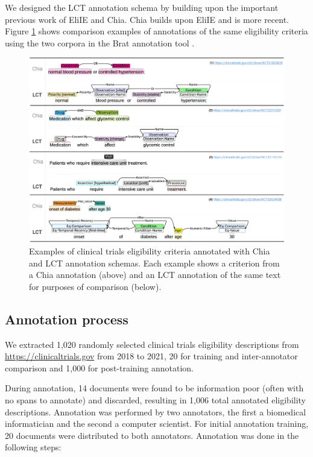\documentclass[../main.tex]{subfiles}
\begin{document}
We designed the LCT annotation schema by building upon the important previous work of EliIE and Chia. Chia builds upon EliIE and is more recent. Figure \ref{aim1_fig_chia_vs_lct} shows comparison examples of annotations of the same eligibility criteria using the two corpora in the Brat annotation tool \cite{stenetorp2012brat}. \\

\begin{figure}[h!]
  \includegraphics[scale=0.56]{_Figures/Aim1/aim1_chia_vs_lct.pdf}  
    \caption{Examples of clinical trials eligibility criteria annotated with Chia and LCT annotation schemas. Each example shows a criterion from a Chia annotation (above) and an LCT annotation of the same text for purposes of comparison (below).}
\label{aim1_fig_chia_vs_lct}
\end{figure}

\subsection{Annotation process}

We extracted 1,020 randomly selected clinical trials eligibility descriptions from \url{https://clinicaltrials.gov} from 2018 to 2021, 20 for training and inter-annotator comparison and 1,000 for post-training annotation. 

During annotation, 14 documents were found to be information poor (often with no spans to annotate) and discarded, resulting in 1,006 total annotated eligibility descriptions. Annotation was performed by two annotators, the first a biomedical informatician and the second a computer scientist. For initial annotation training, 20 documents were distributed to both annotators. Annotation was done in the following steps:
\end{document}
